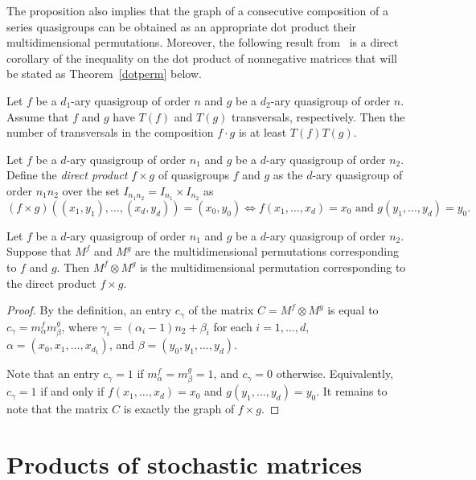 \documentclass[a4paper]{article}
\begin{document}
The proposition also implies that  the graph of a consecutive composition of a series quasigroups can be obtained as an appropriate dot product their multidimensional permutations. 
Moreover, the following result from~\cite[Proposition 12]{my.obzor} is a direct corollary of the inequality on the dot product of nonnegative matrices that will be stated as Theorem~\ref{dotperm} below.


\begin{utv}
Let $f$ be a $d_1$-ary quasigroup  of order $n$ and $g$ be  a $d_2$-ary quasigroup of order $n$.  Assume that $f$ and $g$ have $T(f)$ and $T(g)$ transversals, respectively. Then the number of transversals in the composition  $ f \cdot g$ is at least $T(f) T(g)$. 
\end{utv}


Let $f$ be a $d$-ary quasigroup of order $n_1$ and $g$ be a $d$-ary quasigroup of order $n_2$. 
Define the \textit{direct product}  $f \times g$ of quasigroups $f$ and $g$ as the $d$-ary quasigroup of order $n_1 n_2$ over the set $I_{n_1 n_2} = I_{n_1} \times I_{n_2}$ as
$$(f \times g) ((x_1, y_1), \ldots, (x_d, y_d)) = (x_{0}, y_0)  \Leftrightarrow f (x_{1}, \ldots, x_d) = x_0 \mbox{ and } g(y_1, \ldots, y_d) = y_0.$$ 


\begin{utv}
Let $f$ be a $d$-ary quasigroup of order $n_1$ and $g$ be a $d$-ary quasigroup of order $n_2$.  Suppose that   $M^f$ and $M^g$ are the multidimensional permutations  corresponding to  $f$ and $g$. Then $M^f  \otimes  M^g$ is the multidimensional permutation corresponding to the direct product $f \times g$.
\end{utv}

\begin{proof}
By the definition, an entry $c_{\gamma}$ of the matrix $C = M^f  \otimes M^g$ is equal to $c_{\gamma} =   m^f_{\alpha} m^g_{\beta}$, where $\gamma_i = (\alpha_i -1)n_2 + \beta_i$ for each $i = 1, \ldots, d$,  $\alpha = (x_0, x_1, \ldots, x_{d_1})$, and $\beta = (y_0, y_1, \ldots, y_d)$.

Note that  an  entry $c_\gamma = 1$ if $m^f_{\alpha}  = m^g_{\beta} = 1$,  and $c_\gamma = 0$ otherwise. Equivalently, $c_\gamma = 1$ if and only if $f( x_1, \ldots, x_{d}) = x_0$ and $g ( y_1, \ldots, y_d ) = y_0$. It remains to note  that the matrix $C$ is exactly the graph of $f \times g$. 
\end{proof}



\section{Products of stochastic matrices} \label{stocprodsec}
\end{document}
